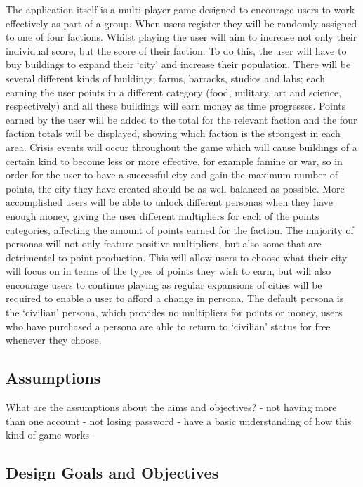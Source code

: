 \documentclass{sig-alt-release2}
\begin{document}
The application itself is a multi-player game designed to encourage users to work effectively as part of a group. When users register they will be randomly assigned to one of four factions. Whilst playing the user will aim to increase not only their individual score, but the score of their faction. To do this, the user will have to buy buildings to expand their `city' and increase their population. There will be several different kinds of buildings; farms, barracks, studios and labs; each earning the user points in a different category (food, military, art and science, respectively) and all these buildings will earn money as time progresses. Points earned by the user will be added to the total for the relevant faction and the four faction totals will be displayed, showing which faction is the strongest in each area. Crisis events will occur throughout the game which will cause buildings of a certain kind to become less or more effective, for example famine or war, so in order for the user to have a successful city and gain the maximum number of points, the city they have created should be as well balanced as possible. More accomplished users will be able to unlock different personas when they have enough money, giving the user different multipliers for each of the points categories, affecting the amount of points earned for the faction. The majority of personas will not only feature positive multipliers, but also some that are detrimental to point production. This will allow users to choose what their city will focus on in terms of the types of points they wish to earn, but will also encourage users to continue playing as regular expansions of cities will be required to enable a user to afford a change in persona. The default persona is the `civilian' persona, which provides no multipliers for points or money, users who have purchased a persona are able to return to `civilian' status for free whenever they choose.

\subsection{Assumptions}

What are the assumptions about the aims and objectives?
- not having more than one account
- not losing password
- have a basic understanding of how this kind of game works
-

\subsection{Design Goals and Objectives} 
\end{document}
